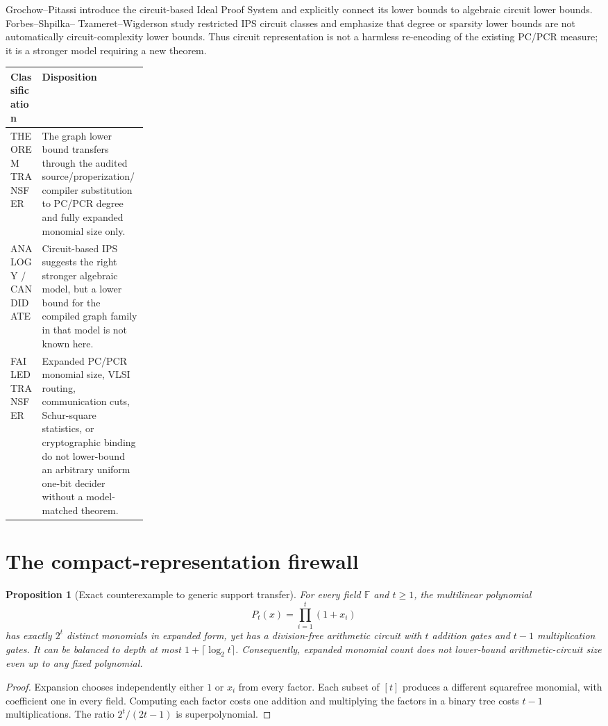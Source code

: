 \documentclass[11pt]{article}
\newtheorem{proposition}{Proposition}
\begin{document}
Grochow--Pitassi introduce the circuit-based Ideal Proof System and explicitly
connect its lower bounds to algebraic circuit lower bounds.  Forbes--Shpilka--
Tzameret--Wigderson study restricted IPS circuit classes and emphasize that
degree or sparsity lower bounds are not automatically circuit-complexity lower
bounds.  Thus circuit representation is not a harmless re-encoding of the
existing PC/PCR measure; it is a stronger model requiring a new theorem.

\begin{center}
\begin{tabularx}{0.96\linewidth}{@{}p{0.23\linewidth}X@{}}
\toprule
Classification & Disposition\\
\midrule
THEOREM TRANSFER & The graph lower bound transfers through the audited
source/properization/compiler substitution to PC/PCR degree and fully
expanded monomial size only.\\
ANALOGY / CANDIDATE & Circuit-based IPS suggests the right stronger algebraic
model, but a lower bound for the compiled graph family in that model is not
known here.\\
FAILED TRANSFER & Expanded PC/PCR monomial size, VLSI routing, communication
cuts, Schur-square statistics, or cryptographic binding do not lower-bound an
arbitrary uniform one-bit decider without a model-matched theorem.\\
\bottomrule
\end{tabularx}
\end{center}

\section{The compact-representation firewall}
\begin{proposition}[Exact counterexample to generic support transfer]
For every field $\mathbb F$ and $t\ge1$, the multilinear polynomial
\[
                  P_t(x)=\prod_{i=1}^t(1+x_i)                 \tag{3}
\]
has exactly $2^t$ distinct monomials in expanded form, yet has a division-free
arithmetic circuit with $t$ addition gates and $t-1$ multiplication gates.
It can be balanced to depth at most $1+\lceil\log_2t\rceil$.
Consequently, expanded monomial count does not lower-bound arithmetic-circuit
size even up to any fixed polynomial.
\end{proposition}
\begin{proof}
Expansion chooses independently either $1$ or $x_i$ from every factor.  Each
subset of $[t]$ produces a different squarefree monomial, with coefficient
one in every field.  Computing each factor costs one addition and multiplying
the factors in a binary tree costs $t-1$ multiplications.  The ratio
$2^t/(2t-1)$ is superpolynomial.
\end{proof}
\end{document}
